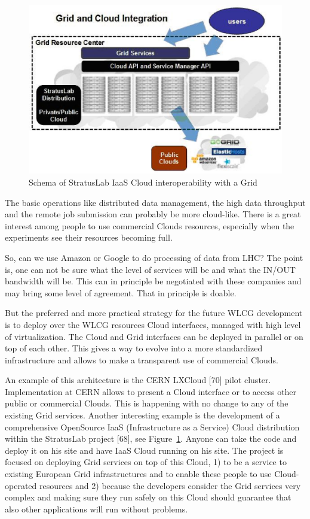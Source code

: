 \documentclass{intech}
\begin{document}
\begin{figure}[htb] %
\centering
\includegraphics[width=13cm]{fig26.eps} %
\caption{Schema of StratusLab IaaS Cloud interoperability with a
Grid}\label{fig26}
\end{figure}



The basic operations like distributed data management, the high data
throughput and  the remote job submission can probably be more
cloud-like. There is a great interest among people to use commercial
Clouds resources, especially when the experiments see their
resources becoming full.

So, can we use Amazon or Google to do processing of data from LHC?
The point is, one can not be sure what the level of services will be
and what the IN/OUT bandwidth will be. This can in principle be
negotiated with these companies and may bring some level of
agreement. That in principle is doable.

But the preferred and more practical strategy for the future WLCG
development is to deploy over the WLCG resources Cloud interfaces,
managed with high level of virtualization. The Cloud and Grid
interfaces can be deployed in parallel or on top of each other. This
gives a way to evolve into a more standardized infrastructure and
allows to make a transparent use of commercial Clouds.

An example of this architecture is the CERN LXCloud [70] pilot
cluster. Implementation at CERN allows to present a Cloud interface
or to access other public or commercial Clouds. This is happening
with no change to any of the existing Grid services. Another
interesting example is the development of a comprehensive OpenSource
IaaS (Infrastructure as a Service) Cloud distribution within the
StratusLab project [68], see Figure~\ref{fig26}. Anyone can take the
code and deploy it on his site and have IaaS Cloud running on his
site. The project is focused on deploying Grid services on top of
this Cloud, 1) to be a service to existing European Grid
infrastructures and to enable these people to use Cloud-operated
resources and 2) because the developers consider the Grid services
very complex and making sure they run safely on this Cloud should
guarantee that also other applications will run without problems.
\end{document}
